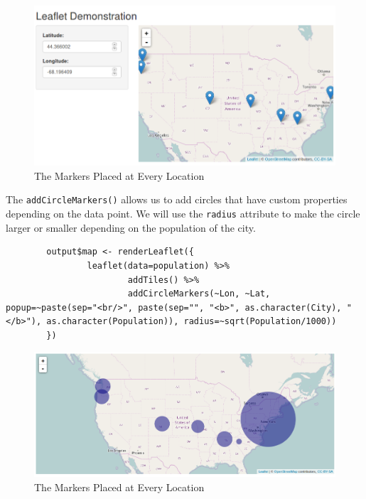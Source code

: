 	\begin{figure}[htbp!]
		\centering
		\includegraphics[width=12cm]{pictures/html/htmlwidgets-image-5.png}
		\caption{The Markers Placed at Every Location}
	\end{figure}

	The \texttt{addCircleMarkers()} allows us to add circles that have custom properties depending on the data point.
        We will use the \texttt{radius} attribute to make the circle larger or smaller depending on the population of the city.
	
        \begin{lstlisting}
        output$map <- renderLeaflet({
                leaflet(data=population) %>%
                        addTiles() %>%
                        addCircleMarkers(~Lon, ~Lat, popup=~paste(sep="<br/>", paste(sep="", "<b>", as.character(City), "</b>"), as.character(Population)), radius=~sqrt(Population/1000))
        })
        \end{lstlisting}
	
	\begin{figure}[htbp!]
		\centering
		\includegraphics[width=.5\textwidth]{pictures/html/htmlwidgets-image-6.png}
		\caption{The Markers Placed at Every Location}
	\end{figure}
